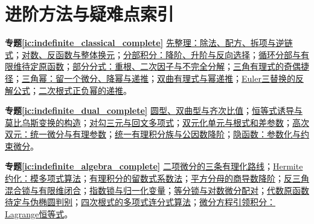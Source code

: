 \section{进阶方法与疑难点索引}
\par\noindent\textbf{专题\ref{ic:indefinite_classical_complete}}\quad 
\hyperref[ic:indefinite_classical_complete:normalize]{先整理：除法、配方、拆项与逆链式}；\hyperref[ic:indefinite_classical_complete:logsub]{对数、反函数与整体换元}；\hyperref[ic:indefinite_classical_complete:parts]{分部积分：降阶、升阶与反向选择}；\hyperref[ic:indefinite_classical_complete:cyclic]{循环分部与有限维待定原函数}；\hyperref[ic:indefinite_classical_complete:partial]{部分分式：重根、二次因子与不完全分解}；\hyperref[ic:indefinite_classical_complete:trigparity]{三角有理式的奇偶捷径}；\hyperref[ic:indefinite_classical_complete:trigpowers]{三角幂：留一个微分、降幂与递推}；\hyperref[ic:indefinite_classical_complete:hyperbolic]{双曲有理式与幂递推}；\hyperref[ic:indefinite_classical_complete:eulerthree]{Euler三替换的反解公式}；\hyperref[ic:indefinite_classical_complete:powerrec]{二次根式正负幂的递推}。\par
\par\noindent\textbf{专题\ref{ic:indefinite_dual_complete}}\quad 
\hyperref[ic:indefinite_dual_complete:differentials]{圆型、双曲型与齐次比值}；\hyperref[ic:indefinite_dual_complete:mobius]{恒等式诱导与莫比乌斯变换的构造}；\hyperref[ic:indefinite_dual_complete:reciprocal]{对勾三元与回文多项式}；\hyperref[ic:indefinite_dual_complete:single]{双元化单元与根式和差参数}；\hyperref[ic:indefinite_dual_complete:highdual]{高次双元：统一微分与有理参数}；\hyperref[ic:indefinite_dual_complete:ufamily]{统一有理积分族与公因数降阶}；\hyperref[ic:indefinite_dual_complete:implicit]{隐函数：参数化与约束微分}。\par
\par\noindent\textbf{专题\ref{ic:indefinite_algebra_complete}}\quad 
\hyperref[ic:indefinite_algebra_complete:binomial]{二项微分的三条有理化路线}；\hyperref[ic:indefinite_algebra_complete:hermitemod]{Hermite约化：模多项式算法}；\hyperref[ic:indefinite_algebra_complete:residue]{有理积分的留数式系数法}；\hyperref[ic:indefinite_algebra_complete:quotient]{平方分母的商导数降阶}；\hyperref[ic:indefinite_algebra_complete:triglock]{反三角混合锁与有限维闭合}；\hyperref[ic:indefinite_algebra_complete:explock]{指数锁与归一化变量}；\hyperref[ic:indefinite_algebra_complete:equalparts]{等分锁与对数微分配对}；\hyperref[ic:indefinite_algebra_complete:exactalg]{代数原函数待定与伪椭圆判别}；\hyperref[ic:indefinite_algebra_complete:continuedfraction]{四次根式的多项式连分式算法}；\hyperref[ic:indefinite_algebra_complete:odeidentity]{微分方程引领积分：Lagrange恒等式}。\par
